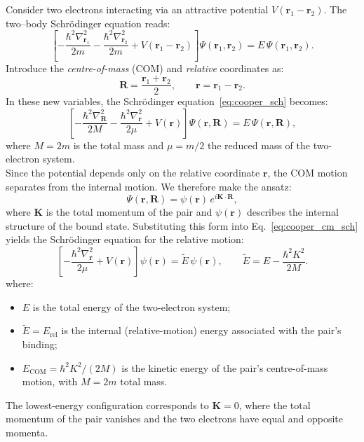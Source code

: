 Consider two electrons interacting via an attractive potential $V(\mathbf{r}_1-\mathbf{r}_2)$.
The two–body Schr\"odinger equation reads:
\begin{equation}
\left[
-\frac{\hbar^2\nabla_{\mathbf{r}_1}^2}{2m}
-\frac{\hbar^2\nabla_{\mathbf{r}_2}^2}{2m}
+ V(\mathbf{r}_1-\mathbf{r}_2)
\right]
\Psi(\mathbf{r}_1,\mathbf{r}_2)
= E\,\Psi(\mathbf{r}_1,\mathbf{r}_2).
\label{eq:cooper_sch}
\end{equation}
Introduce the \textit{centre-of-mass} (COM) and \textit{relative} coordinates as:
\[
\mathbf{R} = \frac{\mathbf{r}_1 + \mathbf{r}_2}{2},
\qquad
\mathbf{r} = \mathbf{r}_1 - \mathbf{r}_2.
\]
In these new variables, the Schrödinger equation~\eqref{eq:cooper_sch} becomes:
\begin{equation}
\left[
-\frac{\hbar^2\nabla_{\mathbf{R}}^2}{2M}
-\frac{\hbar^2\nabla_{\mathbf{r}}^2}{2\mu}
+ V(\mathbf{r})
\right]
\Psi(\mathbf{r},\mathbf{R})
= E\,\Psi(\mathbf{r},\mathbf{R}),
\label{eq:cooper_cm_sch}
\end{equation}
where \(M = 2m\) is the total mass and \(\mu  = m/2\) the reduced mass of the two-electron system.\\
Since the potential depends only on the relative coordinate \(\mathbf{r}\), the COM motion separates from the internal motion.  
We therefore make the ansatz:
\[
\Psi(\mathbf{r},\mathbf{R}) = \psi(\mathbf{r})\, e^{i\mathbf{K}\cdot\mathbf{R}},
\]
where \(\mathbf{K}\) is the total momentum of the pair and \(\psi(\mathbf{r})\) describes the internal structure of the bound state.  
Substituting this form into Eq.~\eqref{eq:cooper_cm_sch} yields the Schrödinger equation for the relative motion:
\begin{equation}
\left[
-\frac{\hbar^2\nabla_{\mathbf{r}}^2}{2\mu}
+ V(\mathbf{r})
\right]\psi(\mathbf{r})
= \tilde{E}\,\psi(\mathbf{r}),
\qquad
\tilde{E} = E - \frac{\hbar^2K^2}{2M}.
\label{eq:cooper_relative_sch}
\end{equation}
where:
\begin{itemize}
    \item \(E\) is the total energy of the two-electron system;
    \item \(\tilde{E} = E_{\mathrm{rel}}\) is the internal (relative-motion) energy associated with the pair’s binding;
    \item \(E_{\mathrm{COM}} = \hbar^2 K^2 / (2M)\) is the kinetic energy of the pair’s centre-of-mass motion, with \(M = 2m\) total mass.
\end{itemize}
The lowest-energy configuration corresponds to $\mathbf{K}=0$, where the total momentum of the pair vanishes and the two electrons have equal and opposite momenta.\\
